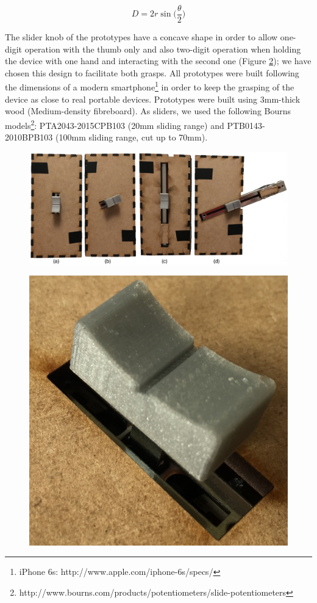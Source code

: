 \documentclass{sigchi}
\begin{document}
\begin{equation}
D=2r\sin\Big(\frac{\theta}{2}\Big)
\end{equation}

The slider knob of the prototypes have a concave shape in order to allow one-digit operation with the thumb only and also two-digit operation when holding the device with one hand and interacting with the second one (Figure \ref{fig:figure3}); we have chosen this design to facilitate both grasps. All prototypes were built following the dimensions of a modern smartphone\footnote{iPhone 6s: http://www.apple.com/iphone-6s/specs/} in order to keep the grasping of the device as close to real portable devices. Prototypes were built using 3mm-thick wood (Medium-density fibreboard). As sliders, we used the following Bourns models\footnote{http://www.bourns.com/products/potentiometers/slide-potentiometers}: PTA2043-2015CPB103 (20mm sliding range) and PTB0143-2010BPB103 (100mm sliding range, cut up to 70mm).

\begin{figure}[h]
\centering
  \includegraphics[width=1\columnwidth]{figures/prototypes}
  \caption{}
  \label{fig:prototypes}
\end{figure}

\begin{figure}[h]
\centering
  \includegraphics[width=0.4\columnwidth]{figures/knob}
  \caption{}
  \label{fig:figure3}
\end{figure}
\end{document}
